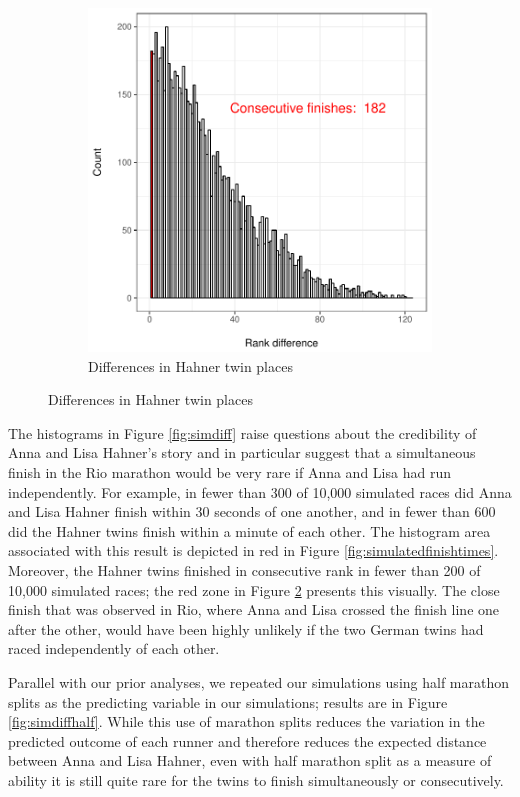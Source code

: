 \documentclass[12pt,titlepage]{article}
\begin{document}
\begin{figure}[!ht]
\begin{subfigure}{.45\textwidth}
    \includegraphics[width=\textwidth, keepaspectratio]{simulated_rank_with_age.pdf}
    \caption{Differences in Hahner twin places}
    \label{fig:simulatedranks}
  \end{subfigure}
\end{figure}

The histograms in Figure \ref{fig:simdiff} raise questions about the
credibility of Anna and Lisa Hahner's story and in particular suggest
that a simultaneous finish in the Rio marathon would be very rare if
Anna and Lisa had run independently. For example, in fewer than 300 of
10,000 simulated races did Anna and Lisa Hahner finish within 30
seconds of one another, and in fewer than 600 did the Hahner twins
finish within a minute of each other.  The histogram area associated
with this result is depicted in red in Figure
\ref{fig:simulatedfinishtimes}.  Moreover, the Hahner twins finished
in consecutive rank in fewer than 200 of 10,000 simulated races; the
red zone in Figure \ref{fig:simulatedranks} presents this visually.
The close finish that was observed in Rio, where Anna and Lisa crossed
the finish line one after the other, would have been highly unlikely
if the two German twins had raced independently of each other.

Parallel with our prior analyses, we repeated our simulations using
half marathon splits as the predicting variable in our simulations;
results are in Figure \ref{fig:simdiffhalf}.  While this use of
marathon splits reduces the variation in the predicted outcome of each
runner and therefore reduces the expected distance between Anna and
Lisa Hahner, even with half marathon split as a measure of ability it
is still quite rare for the twins to finish simultaneously or
consecutively.
\end{document}
